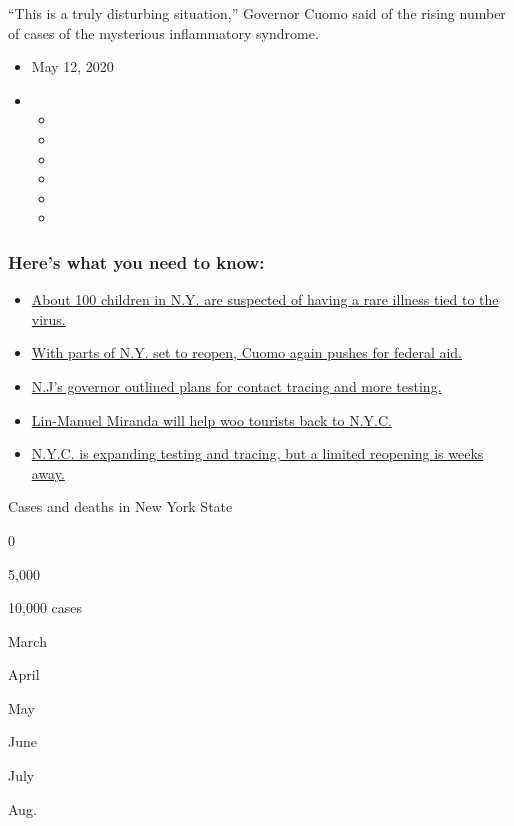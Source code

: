 ``This is a truly disturbing situation,'' Governor Cuomo said of the
rising number of cases of the mysterious inflammatory syndrome.

\begin{itemize}
\item
  May 12, 2020
\item
  \begin{itemize}
  \item
  \item
  \item
  \item
  \item
  \item
  \end{itemize}
\end{itemize}

\hypertarget{heres-what-you-need-to-know}{%
\subsubsection{Here's what you need to
know:}\label{heres-what-you-need-to-know}}

\begin{itemize}
\tightlist
\item
  \protect\hyperlink{link-28c645f6}{About 100 children in N.Y. are
  suspected of having a rare illness tied to the virus.}
\item
  \protect\hyperlink{link-6283b16a}{With parts of N.Y. set to reopen,
  Cuomo again pushes for federal aid.}
\item
  \protect\hyperlink{link-59529e06}{N.J's governor outlined plans for
  contact tracing and more testing.}
\item
  \protect\hyperlink{link-f233ab6}{Lin-Manuel Miranda will help woo
  tourists back to N.Y.C.}
\item
  \protect\hyperlink{link-6f64d26f}{N.Y.C. is expanding testing and
  tracing, but a limited reopening is weeks away.}
\end{itemize}

Cases and deaths in New York State

0

5,000

10,000 cases

March

April

May

June

July

Aug.

